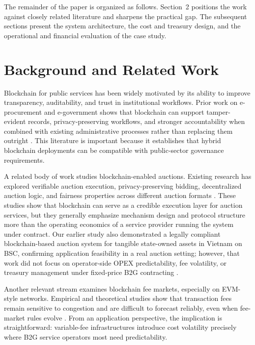 \documentclass[runningheads]{llncs}
\begin{document}
The remainder of the paper is organized as follows. Section~2 positions the work against closely related literature and sharpens the practical gap. The subsequent sections present the system architecture, the cost and treasury design, and the operational and financial evaluation of the case study.

\section{Background and Related Work}

Blockchain for public services has been widely motivated by its ability to improve transparency, auditability, and trust in institutional workflows. Prior work on e-procurement and e-government shows that blockchain can support tamper-evident records, privacy-preserving workflows, and stronger accountability when combined with existing administrative processes rather than replacing them outright \cite{ref_Akaba2020,ref_Baranwal2020,ref_SmartProcurement2021,ref_BlockchainPlatform2021,ref_Alqodsi2025}. This literature is important because it establishes that hybrid blockchain deployments can be compatible with public-sector governance requirements.

A related body of work studies blockchain-enabled auctions. Existing research has
explored verifiable auction execution, privacy-preserving bidding,
decentralized auction logic, and fairness properties across different auction
formats \cite{ref_Shi2023,ref_DecAuctionSurvey2023}. These studies show that
blockchain can serve as a credible execution layer for auction services, but
they generally emphasize mechanism design and protocol structure more than the
operating economics of a service provider running the system under contract.
Our earlier study also demonstrated a legally compliant blockchain-based auction
system for tangible state-owned assets in Vietnam on BSC, confirming
application feasibility in a real auction setting; however, that work did not
focus on operator-side OPEX predictability, fee volatility, or treasury
management under fixed-price B2G contracting \cite{ref_Le2026DAS}.

Another relevant stream examines blockchain fee markets, especially on EVM-style networks. Empirical and theoretical studies show that transaction fees remain sensitive to congestion and are difficult to forecast reliably, even when fee-market rules evolve \cite{ref_Liu2022EIP1559,ref_Honeymoon2022,ref_DeepARGas2023}. From an application perspective, the implication is straightforward: variable-fee infrastructures introduce cost volatility precisely where B2G service operators most need predictability.
\end{document}
